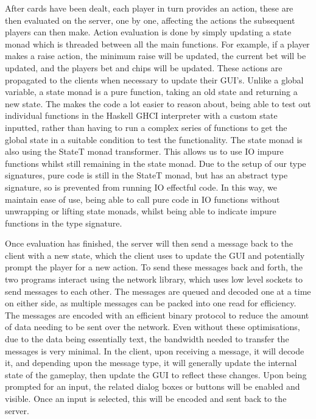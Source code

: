 After cards have been dealt, each player in turn provides an action, these are
then evaluated on the server, one by one, affecting the actions the subsequent
players can then make. Action evaluation is done by simply updating a state 
monad which is threaded between all the main functions. For example, if a 
player makes a raise action, the minimum raise will be updated, the current bet 
will be updated, and the players bet and chips will be updated. These actions 
are propagated to the clients when necessary to update their GUI's. Unlike a 
global variable, a state monad is a pure function, taking an old state and 
returning a new state. The makes the code a lot easier to reason about, being 
able to test out individual functions in the Haskell GHCI interpreter with a 
custom state inputted, rather than having to run a complex series of functions 
to get the global state in a suitable condition to test the functionality. 
The state monad is also using the StateT monad transformer. This allows us to 
use IO impure functions whilst still remaining in the state monad. Due to the
setup of our type signatures, pure code is still in the StateT monad, but
has an abstract type signature, so is prevented from running IO effectful code.
In this way, we maintain ease of use, being able to call pure code in IO
functions without unwrapping or lifting state monads, whilst being able to
indicate impure functions in the type signature.

Once evaluation has finished, the server will then send a message back to the
client with a new state, which the client uses to update the GUI and
potentially prompt the player for a new action. To send these messages back
and forth, the two programs interact using the network library, which uses low 
level sockets to send messages to each other. The messages are queued and 
decoded one at a time on either side, as multiple messages can be packed into 
one read for efficiency. The messages are encoded with an efficient binary 
protocol to reduce the amount of data needing to be sent over the network. 
Even without these optimisations, due to the data being essentially text, the 
bandwidth needed to transfer the messages is very minimal. In the client, upon 
receiving a message, it will decode it, and depending upon the message type, 
it will generally update the internal state of the gameplay, then update the 
GUI to reflect these changes. Upon being prompted for an input, the related 
dialog boxes or buttons will be enabled and visible. Once an input is selected, 
this will be encoded and sent back to the server.


